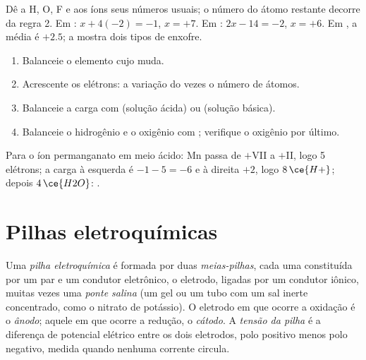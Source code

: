 \begin{method}\label{met:b1:nernst:oxidation-numbers}
Dê a H, O, F e aos íons seus números usuais; o número do átomo restante
decorre da regra 2. Em : $x + 4(-2) = -1$, $x = +7$. Em
: $2x - 14 = -2$, $x = +6$. Em , a média é
$+2.5$; a  mostra dois tipos de enxofre.
\end{method}

\begin{method}\label{met:b1:nernst:balance-by-on}
\begin{enumerate}
  \item Balanceie o elemento cujo  muda.
  \item Acrescente os elétrons: a variação do  vezes o
        número de átomos.
  \item Balanceie a carga com  (solução ácida) ou 
        (solução básica).
  \item Balanceie o hidrogênio e o oxigênio com ; verifique o
        oxigênio por último.
\end{enumerate}
Para o íon permanganato em meio ácido: Mn passa de $+$VII a $+$II, logo 5
elétrons; a carga à esquerda é $-1 - 5 = -6$ e à direita $+2$, logo
$8\,\ce{H+}$; depois $4\,\ce{H2O}$:
.
\end{method}

\section{Pilhas eletroquímicas}

\begin{definition}\label{def:b1:nernst:cell}
Uma \emph{pilha eletroquímica} é formada por duas
\emph{meias-pilhas}, cada uma constituída por um par e um
condutor eletrônico, o eletrodo, ligadas por um condutor iônico, muitas
vezes uma \emph{ponte salina} (um gel ou um tubo com
um sal inerte concentrado, como o nitrato de potássio). O eletrodo em
que ocorre a oxidação é o \emph{ânodo}; aquele em que
ocorre a redução, o \emph{cátodo}. A \emph{tensão da
pilha} é a diferença de potencial elétrico
entre os dois eletrodos, polo positivo menos polo negativo, medida
quando nenhuma corrente circula.
\end{definition}

